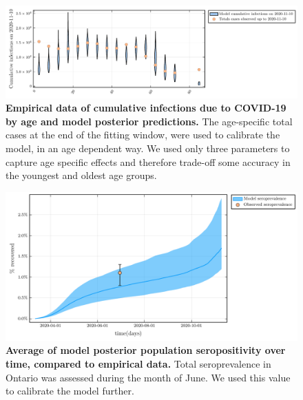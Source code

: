     \clearpage 
    
    \begin{figure}[H]
    \centering
    \includegraphics[width = 12 cm]{appendices/FigureS4.pdf}
    \caption{\textbf{Empirical data of cumulative infections due to COVID-19 by age and model posterior predictions.} The age-specific total cases at the end of the fitting window, were used to calibrate the model, in an age dependent way. We used only three parameters to capture age specific effects and therefore trade-off some accuracy in the youngest and oldest age groups.}
    \label{s4}
    \end{figure}
    
    \clearpage 
    
    \begin{figure}[H]
    \centering
    \includegraphics[width = 12 cm]{appendices/FigureS5.pdf}
    \caption{\textbf{Average of model posterior population seropositivity over time, compared to empirical data.} Total seroprevalence in Ontario was assessed during the month of June. We used this value to calibrate the model further.  }
    \label{s5}
    \end{figure}
    
    \clearpage 
    
